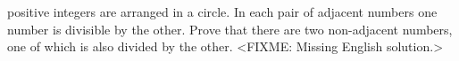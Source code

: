  positive integers are arranged in a circle.
In each pair of adjacent numbers one number is divisible by the other.
Prove that there are two non-adjacent numbers, one of which is also divided by
the other.
\solution
<FIXME: Missing English solution.>
\endproblem
